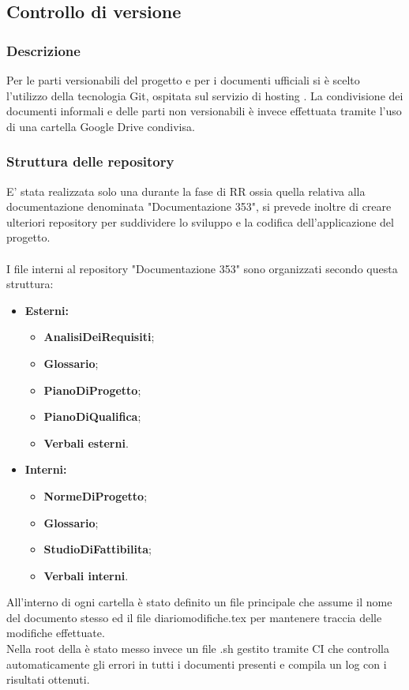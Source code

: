 \documentclass[NormeDiProgetto.tex]{subfiles}
\begin{document}
	\subsection{Controllo di versione}
	
	\subsubsection{Descrizione}
	Per le parti versionabili del progetto e per i documenti ufficiali si è scelto l'utilizzo della tecnologia Git, ospitata sul servizio di hosting .
	La condivisione dei documenti informali e delle parti non versionabili è invece effettuata tramite l'uso di una cartella Google Drive condivisa.
	
	\subsubsection{Struttura delle repository}
	E' stata realizzata solo una  durante la fase di RR ossia quella relativa alla documentazione denominata "Documentazione 353", si prevede inoltre di creare ulteriori repository per suddividere lo sviluppo e la codifica dell'applicazione del progetto. \\\\
	I file interni al repository "Documentazione 353" sono organizzati secondo questa struttura:
	\begin{itemize}
		\item \textbf{Esterni:}
				\begin{itemize}
				\item \textbf{AnalisiDeiRequisiti};
				\item \textbf{Glossario};
				\item \textbf{PianoDiProgetto};
				\item \textbf{PianoDiQualifica};
				\item \textbf{Verbali esterni}.
			\end{itemize}
		\item \textbf{Interni:}
				\begin{itemize}
					\item \textbf{NormeDiProgetto};
					\item \textbf{Glossario};
					\item \textbf{StudioDiFattibilita};
					\item \textbf{Verbali interni}.
				\end{itemize}		
	\end{itemize}	
	All'interno di ogni cartella è stato definito un file  principale che assume il nome del documento stesso ed il file diariomodifiche.tex per mantenere traccia delle modifiche effettuate.\\
	Nella root della  è stato messo invece un file .sh gestito tramite  CI che controlla automaticamente gli errori in tutti i documenti presenti e compila un log con i risultati ottenuti.
	
\end{document}

